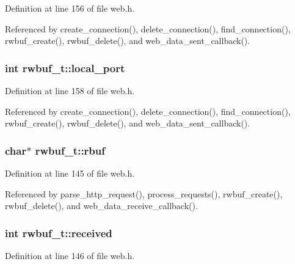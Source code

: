 Definition at line 156 of file web.\-h.



Referenced by create\-\_\-connection(), delete\-\_\-connection(), find\-\_\-connection(), rwbuf\-\_\-create(), rwbuf\-\_\-delete(), and web\-\_\-data\-\_\-sent\-\_\-callback().

\hypertarget{structrwbuf__t_aac758cef289d022f4eb81d4c4fac7f04}{
\subsubsection[{local\-\_\-port}]{\setlength{\rightskip}{0pt plus 5cm}int rwbuf\-\_\-t\-::local\-\_\-port}}\label{structrwbuf__t_aac758cef289d022f4eb81d4c4fac7f04}


Definition at line 158 of file web.\-h.



Referenced by create\-\_\-connection(), delete\-\_\-connection(), find\-\_\-connection(), rwbuf\-\_\-create(), rwbuf\-\_\-delete(), and web\-\_\-data\-\_\-sent\-\_\-callback().

\hypertarget{structrwbuf__t_afd83372241273849c9395d587b146021}{
\subsubsection[{rbuf}]{\setlength{\rightskip}{0pt plus 5cm}char$\ast$ rwbuf\-\_\-t\-::rbuf}}\label{structrwbuf__t_afd83372241273849c9395d587b146021}


Definition at line 145 of file web.\-h.



Referenced by parse\-\_\-http\-\_\-request(), process\-\_\-requests(), rwbuf\-\_\-create(), rwbuf\-\_\-delete(), and web\-\_\-data\-\_\-receive\-\_\-callback().

\hypertarget{structrwbuf__t_ac76412a0fbf9dc009ae3f8bb20660883}{
\subsubsection[{received}]{\setlength{\rightskip}{0pt plus 5cm}int rwbuf\-\_\-t\-::received}}\label{structrwbuf__t_ac76412a0fbf9dc009ae3f8bb20660883}


Definition at line 146 of file web.\-h.



